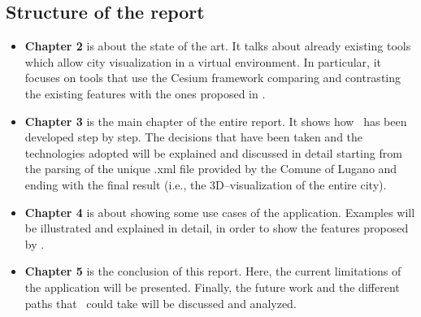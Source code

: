 \subsection{Structure of the report}
\begin{itemize}
	\item {\bf Chapter 2} is about the state of the art. It talks about already existing tools which allow city visualization in a virtual environment. In particular, it focuses on tools that use the Cesium framework comparing and contrasting the existing features with the ones proposed in \applicationName.
	\item {\bf Chapter 3} is the main chapter of the entire report. It shows how \applicationName\ has been developed step by step. The decisions that have been taken and the technologies adopted will be explained and discussed in detail starting from the parsing of the unique .xml file provided by the Comune of Lugano and ending with the final result (i.e., the 3D--visualization of the entire city). 
	\item {\bf Chapter 4} is about showing some use cases of the application. Examples will be illustrated and explained in detail, in order to show the features proposed by \applicationName. 
	\item {\bf Chapter 5} is the conclusion of this report. Here, the current limitations of the application will be presented. Finally, the future work and the different paths that \applicationName\ could take will be discussed and analyzed.
\end{itemize}